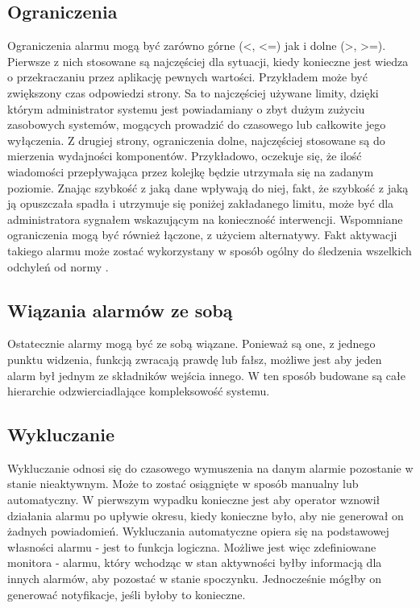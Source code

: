     \subsection{Ograniczenia}
    Ograniczenia alarmu mogą być zarówno górne (<, <=) jak i dolne (>, >=). Pierwsze z nich stosowane są
    najczęściej dla sytuacji, kiedy konieczne jest wiedza o przekraczaniu przez aplikację pewnych wartości.
    Przykładem może być zwiększony czas odpowiedzi strony. Sa to najczęściej używane limity, dzięki którym
    administrator systemu jest powiadamiany o zbyt dużym zużyciu zasobowych systemów, mogących prowadzić
    do czasowego lub całkowite jego wyłączenia. Z drugiej strony, ograniczenia dolne, najczęściej
    stosowane są do mierzenia wydajności komponentów. Przykładowo, oczekuje się, że ilość wiadomości
    przepływająca przez kolejkę będzie utrzymała się na zadanym poziomie. Znając szybkość z jaką dane 
    wpływają do niej, fakt, że szybkość z jaką ją opuszczała spadła i utrzymuje się poniżej zakładanego
    limitu, może być dla administratora sygnałem wskazującym na konieczność interwencji.
    Wspomniane ograniczenia mogą być również łączone, z użyciem alternatywy. Fakt aktywacji takiego
    alarmu może zostać wykorzystany w sposób ogólny do śledzenia wszelkich odchyleń od normy \cite{monitoring_and_alerting}.
    
    \subsection{Wiązania alarmów ze sobą}
    Ostatecznie alarmy mogą być ze sobą wiązane. Ponieważ są one, z jednego punktu widzenia, funkcją
    zwracają prawdę lub fałsz, możliwe jest aby jeden alarm był jednym ze składników wejścia innego.
    W ten sposób budowane są całe hierarchie odzwierciadlające kompleksowość systemu. 
    
    \subsection{Wykluczanie}
    
        Wykluczanie odnosi się do czasowego wymuszenia na danym alarmie pozostanie w stanie nieaktywnym.
        Może to zostać osiągnięte w sposób manualny lub automatyczny. W pierwszym wypadku konieczne jest
        aby operator wznowił działania alarmu po upływie okresu, kiedy konieczne było, aby nie
        generował on żadnych powiadomień. Wykluczania automatyczne opiera się na podstawowej własności
        alarmu - jest to funkcja logiczna. Możliwe jest więc zdefiniowane monitora - alarmu, który wchodząc
        w stan aktywności byłby informacją dla innych alarmów, aby pozostać w stanie spoczynku. Jednocześnie
        mógłby on generować notyfikacje, jeśli byłoby to konieczne. 
    
